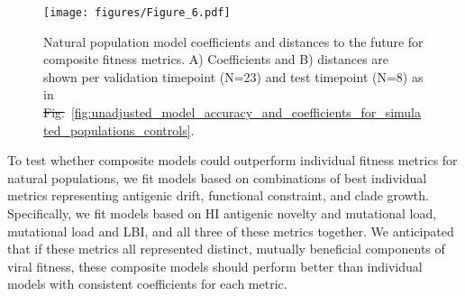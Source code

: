 \documentclass[9pt,lineno]{elife} %
\providecommand{\DIFadd}[1]{{\protect\color{blue}\uwave{#1}}} %
\providecommand{\DIFdel}[1]{{\protect\color{red}\sout{#1}}}                      %
\providecommand{\DIFaddFL}[1]{\DIFadd{#1}} %
\providecommand{\DIFdelFL}[1]{\DIFdel{#1}} %
\providecommand{\DIFaddbeginFL}{} %
\providecommand{\DIFaddendFL}{} %
\providecommand{\DIFdelbeginFL}{} %
\providecommand{\DIFdelendFL}{} %
\providecommand{\DIFaddtex}[1]{{\protect\color{blue}\uwave{#1}}} %
\providecommand{\DIFdeltex}[1]{{\protect\color{red}\sout{#1}}}                      %
\providecommand{\DIFaddFL}[1]{\DIFadd{#1}} %
\providecommand{\DIFdelFL}[1]{\DIFdel{#1}} %
\providecommand{\DIFaddbeginFL}{} %
\providecommand{\DIFaddendFL}{} %
\providecommand{\DIFdelbeginFL}{} %
\providecommand{\DIFdelendFL}{} %
\providecommand{\DIFadd}[1]{\texorpdfstring{\DIFaddtex{#1}}{#1}} %
\providecommand{\DIFdel}[1]{\texorpdfstring{\DIFdeltex{#1}}{}} %
\newcommand{\DIFscaledelfig}{0.5}
\newlength{\DIFdelgraphicswidth} %
\newlength{\DIFdelgraphicsheight} %
\newcommand{\DIFaddincludegraphics}[2][]{{\color{blue}\fbox{\DIFOincludegraphics[#1]{#2}}}} %
\newcommand{\DIFdelincludegraphics}[2][]{%
\sbox{\DIFdelgraphicsbox}{\DIFOincludegraphics[#1]{#2}}%
\settoboxwidth{\DIFdelgraphicswidth}{\DIFdelgraphicsbox} %
\settoboxtotalheight{\DIFdelgraphicsheight}{\DIFdelgraphicsbox} %
\scalebox{\DIFscaledelfig}{%
\parbox[b]{\DIFdelgraphicswidth}{\usebox{\DIFdelgraphicsbox}\\[-\baselineskip] \rule{\DIFdelgraphicswidth}{0em}}\llap{\resizebox{\DIFdelgraphicswidth}{\DIFdelgraphicsheight}{%
\setlength{\unitlength}{\DIFdelgraphicswidth}%
\begin{picture}(1,1)%
\thicklines\linethickness{2pt} %
{\color[rgb]{1,0,0}\put(0,0){\framebox(1,1){}}}%
{\color[rgb]{1,0,0}\put(0,0){\line( 1,1){1}}}%
{\color[rgb]{1,0,0}\put(0,1){\line(1,-1){1}}}%
\end{picture}%
}\hspace*{3pt}}} %
} %
\DeclareRobustCommand{\DIFaddbeginFL}{\DIFOaddbeginFL \let\includegraphics\DIFaddincludegraphics} %
\DeclareRobustCommand{\DIFaddendFL}{\DIFOaddendFL \let\includegraphics\DIFOincludegraphics} %
\DeclareRobustCommand{\DIFdelbeginFL}{\DIFOdelbeginFL \let\includegraphics\DIFdelincludegraphics} %
\DeclareRobustCommand{\DIFdelendFL}{\DIFOaddendFL \let\includegraphics\DIFOincludegraphics} %
\begin{document}
\begin{figure}[htb]
  \DIFdelbeginFL %
\DIFdelendFL \DIFaddbeginFL \texttt{[image: figures/Figure\_6.pdf]}
  \DIFaddendFL \caption{
    Natural population model coefficients and distances to the future for composite fitness metrics.
    A) Coefficients and B) distances are shown per validation timepoint (N=23) and test timepoint (N=8) as in \DIFdelbeginFL \DIFdelFL{Fig.}\DIFdelendFL \DIFaddbeginFL \DIFaddFL{Figure}\DIFaddendFL ~\ref{fig:unadjusted_model_accuracy_and_coefficients_for_simulated_populations_controls}.
  }
  \label{fig:unadjusted_composite_model_accuracy_and_coefficients_for_natural_populations}
\DIFdelbeginFL %
\DIFdelendFL \DIFaddbeginFL 

  \label{figsupp:updated_model_accuracy_and_coefficients_for_natural_populations_across_test_data}

\DIFaddendFL \end{figure}

To test whether composite models could outperform individual fitness metrics for natural populations, we fit models based on combinations of best individual metrics representing antigenic drift, functional constraint, and clade growth.
Specifically, we fit models based on HI antigenic novelty and mutational load, mutational load and LBI, and all three of these metrics together.
We anticipated that if these metrics all represented distinct, mutually beneficial components of viral fitness, these composite models should perform better than individual models with consistent coefficients for each metric.
\end{document}
